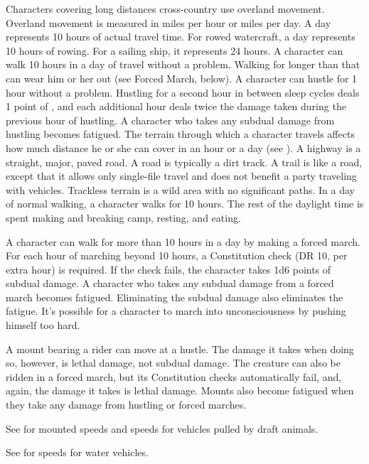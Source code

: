 Characters covering long distances cross-country use overland movement. Overland movement is measured in miles per hour or miles per day. A day represents 10 hours of actual travel time. For rowed watercraft, a day represents 10 hours of rowing. For a sailing ship, it represents 24 hours.
 A character can walk 10 hours in a day of travel without a problem. Walking for longer than that can wear him or her out (see Forced March, below).
 A character can hustle for 1 hour without a problem. Hustling for a second hour in between sleep cycles deals 1 point of , and each additional hour deals twice the damage taken during the previous hour of hustling. A character who takes any subdual damage from hustling becomes fatigued.
 The terrain through which a character travels affects how much distance he or she can cover in an hour or a day (see ). A highway is a straight, major, paved road. A road is typically a dirt track. A trail is like a road, except that it allows only single-file travel and does not benefit a party traveling with vehicles. Trackless terrain is a wild area with no significant paths.
 In a day of normal walking, a character walks for 10 hours. The rest of the daylight time is spent making and breaking camp, resting, and eating.

A character can walk for more than 10 hours in a day by making a forced march. For each hour of marching beyond 10 hours, a Constitution check (DR 10,  per extra hour) is required. If the check fails, the character takes 1d6 points of subdual damage. A character who takes any subdual damage from a forced march becomes fatigued. Eliminating the subdual damage also eliminates the fatigue. It's possible for a character to march into unconsciousness by pushing himself too hard.

 A mount bearing a rider can move at a hustle. The damage it takes when doing so, however, is lethal damage, not subdual damage. The creature can also be ridden in a forced march, but its Constitution checks automatically fail, and, again, the damage it takes is lethal damage. Mounts also become fatigued when they take any damage from hustling or forced marches.

See  for mounted speeds and speeds for vehicles pulled by draft animals.

 See  for speeds for water vehicles.

